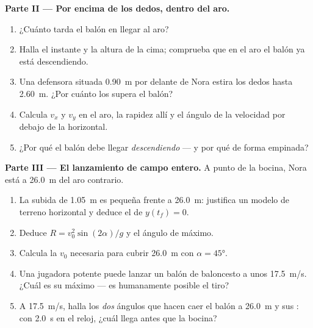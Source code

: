 \begin{problem}
\medskip\noindent\textbf{Parte II --- Por encima de los dedos, dentro del aro.}
\begin{enumerate}[resume]
  \item ¿Cuánto tarda el balón en llegar al aro?
  \item Halla el instante y la altura de la cima; comprueba que en el aro el balón ya
        está descendiendo.
  \item Una defensora situada \qty{0.90}{m} por delante de Nora estira los dedos hasta
        \qty{2.60}{m}. ¿Por cuánto los supera el balón?
  \item Calcula $v_x$ y $v_y$ en el aro, la rapidez allí y el ángulo de la velocidad
        por debajo de la horizontal.
  \item ¿Por qué el balón debe llegar \emph{descendiendo} --- y por qué de forma
        empinada?
\end{enumerate}

\medskip\noindent\textbf{Parte III --- El lanzamiento de campo entero.} A punto de
 la bocina, Nora está a \qty{26.0}{m} del aro contrario.
\begin{enumerate}[resume]
  \item La subida de \qty{1.05}{m} es pequeña frente a \qty{26.0}{m}: justifica un
        modelo de terreno horizontal y deduce el  de $y(t_f) = 0$.
  \item Deduce $R = v_0^2\sin(2\alpha)/g$ y el ángulo de  máximo.
  \item Calcula la $v_0$ necesaria para cubrir \qty{26.0}{m} con $\alpha = \ang{45}$.
  \item Una jugadora potente puede lanzar un balón de baloncesto a unos
        \qty{17.5}{m/s}. ¿Cuál es su  máximo --- es humanamente posible el
        tiro?
  \item A \qty{17.5}{m/s}, halla los \emph{dos} ángulos que hacen caer el balón a
        \qty{26.0}{m} y sus : con \qty{2.0}{s} en el reloj, ¿cuál
        llega antes que la bocina?
\end{enumerate}


\end{problem}
